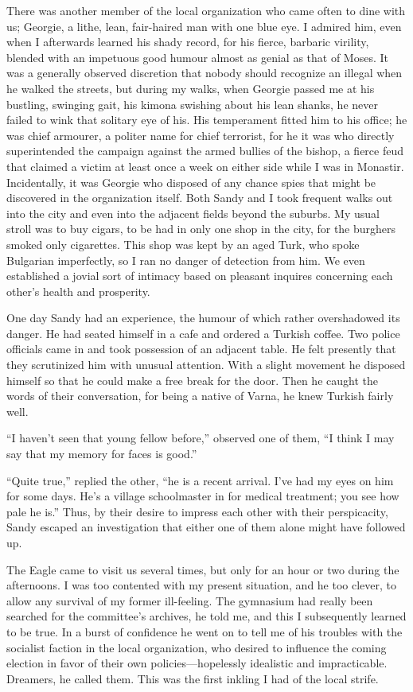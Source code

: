 \documentclass[a5paper,12pt]{book}
\begin{document}
There was another member of the local organization who came often to dine with us; Georgie, a lithe, lean, fair-haired man with one blue eye. I admired him, even when I afterwards learned his shady record, for his fierce, barbaric virility, blended with an impetuous good humour almost as genial as that of Moses. It was a generally observed discretion that nobody should recognize an illegal when he walked the streets, but during my walks, when Georgie passed me at his bustling, swinging gait, his kimona swishing about his lean shanks, he never failed to wink that solitary eye of his. His temperament fitted him to his office; he was chief armourer, a politer name for chief terrorist, for he it was who directly superintended the campaign against the armed bullies of the bishop, a fierce feud that claimed a victim at least once a week on either side while I was in Monastir. Incidentally, it was Georgie who disposed of any chance spies that might be discovered in the organization itself.
Both Sandy and I took frequent walks out into the city and even into the adjacent fields beyond the suburbs. My usual stroll was to buy cigars, to be had in only one shop in the city, for the burghers smoked only cigarettes. This shop was kept by an aged Turk, who spoke Bulgarian imperfectly, so I ran no danger of detection from him. We even established a jovial sort of intimacy based on pleasant inquires concerning each other’s health and prosperity.

One day Sandy had an experience, the humour of which rather overshadowed its danger. He had seated himself in a cafe and ordered a Turkish coffee. Two police officials came in and took possession of an adjacent table. He felt presently that they scrutinized him with unusual attention. With a slight movement he disposed himself so that he could make a free break for the door. Then he caught the words of their conversation, for being a native of Varna, he knew Turkish fairly well.

“I haven’t seen that young fellow before,” observed one of them, “I think I may say that my memory for faces is good.”

“Quite true,” replied the other, “he is a recent arrival. I’ve had my eyes on him for some days. He’s a village schoolmaster in for medical treatment; you see how pale he is.” Thus, by their desire to impress each other with their perspicacity, Sandy escaped an investigation that either one of them alone might have followed up.

The Eagle came to visit us several times, but only for an hour or two during the afternoons. I was too contented with my present situation, and he too clever, to allow any survival of my former ill-feeling. The gymnasium had really been searched for the committee’s archives, he told me, and this I subsequently learned to be true. In a burst of confidence he went on to tell me of his troubles with the socialist faction in the local organization, who desired to influence the coming election in favor of their own policies—hopelessly idealistic and impracticable. Dreamers, he called them. This was the first inkling I had of the local strife.
\end{document}
